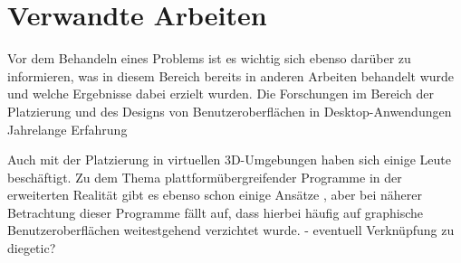 
\chapter{Verwandte Arbeiten}\label{chapter:background}
	

	
		
		
		
		
		
	Vor dem Behandeln eines Problems ist es wichtig sich ebenso darüber zu informieren, was in diesem Bereich bereits in anderen Arbeiten behandelt wurde und welche Ergebnisse dabei erzielt wurden.
	Die Forschungen im Bereich der Platzierung und des Designs von Benutzeroberflächen in Desktop-Anwendungen  Jahrelange Erfahrung
	
	
	Auch mit der Platzierung in virtuellen 3D-Umgebungen haben sich einige Leute beschäftigt. 
	Zu dem Thema plattformübergreifender Programme in der erweiterten Realität gibt es ebenso schon einige Ansätze , aber bei näherer Betrachtung dieser Programme fällt auf, dass hierbei häufig auf graphische Benutzeroberflächen weitestgehend verzichtet wurde. 
	- eventuell Verknüpfung zu diegetic?
		
